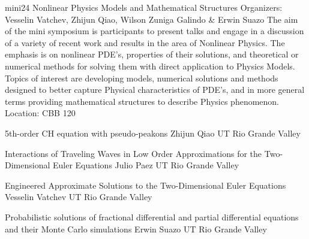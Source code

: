\mini
{mini24}
{Nonlinear Physics Models and Mathematical Structures}
{Organizers: Vesselin Vatchev, Zhijun Qiao, Wilson Zuniga Galindo \& Erwin Suazo}
{The aim of the mini symposium is participants to present talks and engage in a discussion of a variety of recent work and results in the area of Nonlinear Physics. The emphasis is on nonlinear PDE’s, properties of their solutions, and theoretical or numerical methods for solving them with direct application to Physics Models. Topics of interest are developing models, numerical solutions and methods designed to better capture Physical characteristics of PDE’s, and in more general terms providing mathematical structures to describe Physics phenomenon.}
{Location: CBB 120}

\begin{talks}
\item\talk
{5th-order CH equation with pseudo-peakons}
{Zhijun Qiao }
{UT Rio Grande Valley}
\item\talk
{Interactions of Traveling Waves in Low Order Approximations
for the Two-Dimensional Euler Equations}
{Julio Paez}
{UT Rio Grande Valley}
\item\talk
{Engineered Approximate Solutions to the Two-Dimensional Euler Equations}
{Vesselin Vatchev}
{UT Rio Grande Valley}
\item\talk
{Probabilistic solutions of fractional differential and partial differential equations and their Monte Carlo simulations}
{Erwin Suazo}
{UT Rio Grande Valley}
\end{talks}
\room
